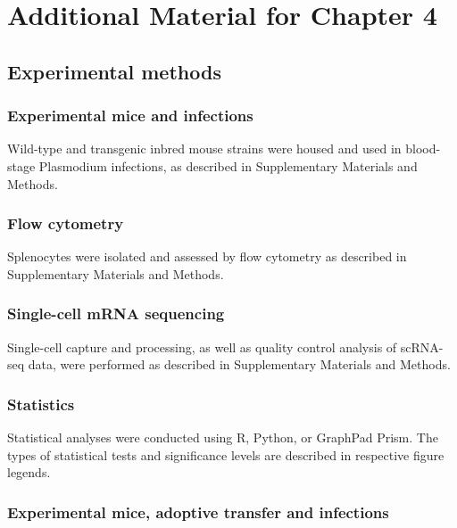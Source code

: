 
\chapter{Additional Material for Chapter 4}

\graphicspath{{Appendix3/Figs/}}

\section{Experimental methods} \label{sec:malaria-methods}

\subsection{Experimental mice and infections}

Wild-type and transgenic inbred mouse strains were housed and used in blood-stage Plasmodium infections, as described in Supplementary Materials and Methods.

\subsection{Flow cytometry}

Splenocytes were isolated and assessed by flow cytometry as described in Supplementary Materials and Methods.

\subsection{Single-cell mRNA sequencing}

Single-cell capture and processing, as well as quality control analysis of scRNA-seq data, were performed as described in Supplementary Materials and Methods.

\subsection{Statistics}

Statistical analyses were conducted using R, Python, or GraphPad Prism. The types of statistical tests and significance levels are described in respective figure legends.

\subsection{Experimental mice, adoptive transfer and infections}

